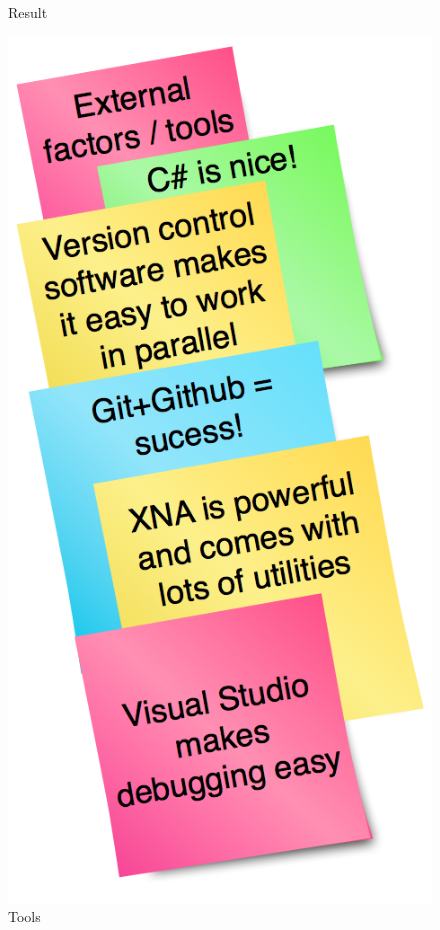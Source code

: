 \documentclass[titlepage,a4paper,11pt]{article}
\begin{document}
\begin{figure}[H]
\begin{minipage}[b]{0.5\linewidth}
        \caption{Result}
        \label{fig:pos3}
    \end{minipage}
    \hspace{0.5cm}
    \begin{minipage}[b]{0.5\linewidth}
        \centering
\includegraphics[scale=0.4]{graphics/postit/POS_external_factoors_tools}
        \caption{Tools}
        \label{fig:pos4}
    \end{minipage}
\end{figure}
\end{document}
